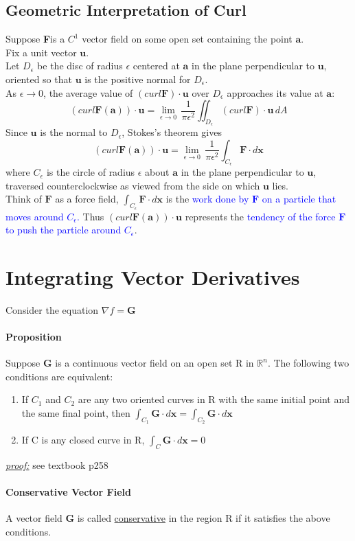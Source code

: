 \documentclass[11pt]{article}
\newcommand{\tb}[1]{\textbf{#1}}
\newcommand{\real}[0]{\mathbb{R}}
\newcommand{\under}[1]{\underline{#1}}
\newcommand{\proof}[0]{\textit{\underline{proof:} }}
\newcommand{\vx}[0]{\tb{x}}
\newcommand{\va}[0]{\tb{a}}
\newcommand{\vf}[0]{\tb{F}}
\newcommand{\vg}[0]{\tb{G}}
\newcommand{\vu}[0]{\tb{u}}
\begin{document}
\subsection{Geometric Interpretation of Curl}
Suppose \vf is a $C^1$ vector field on some open set containing the point $\va$.\\
Fix a unit vector $\vu$. \\
Let $D_\epsilon$ be the disc of radius $\epsilon$ centered at $\va$ in the plane perpendicular to $\vu$, oriented so that $\vu$ is the positive normal for $D_\epsilon$.\\
As $\epsilon \rightarrow 0$, the average value of $(curl \vf) \cdot \vu$ over $D_\epsilon$ approaches its value at $\va$:
$$(curl \vf ( \va ) ) \cdot \vu = \underset{\epsilon \rightarrow 0}{\lim} \,\frac{1}{\pi \epsilon^2} \iint_{D_\epsilon} (curl\vf) \cdot \vu \,dA$$
Since $\vu$ is the normal to $D_\epsilon$, Stokes's theorem gives
$$(curl \vf(\va))\cdot \vu = \underset{\epsilon \rightarrow 0}{\lim} \,\frac{1}{\pi \epsilon^2} \int_{C_\epsilon}\vf\cdot d\vx$$ where $C_\epsilon$ is the circle of radius $\epsilon$ about $\va$ in the plane perpendicular to $\vu$, traversed counterclockwise as viewed from the side on which $\vu$ lies. \\
Think of $\vf$ as a force field, $\int_{C_\epsilon}\vf\cdot d\vx$ is the \textcolor{blue}{work done by $\vf$ on a particle that moves around $C_\epsilon$.} Thus $(curl \vf(\va))\cdot \vu$ represents the \textcolor{blue}{tendency of the force $\vf$ to push the particle around $C_\epsilon$}.
\section{Integrating Vector Derivatives}
Consider the equation $\nabla f = \tb{G}$
\paragraph{Proposition} Suppose \tb{G} is a continuous vector field on an open set R in $\real^n$. The following two conditions are equivalent:
\begin{enumerate}
	\item If $C_1$ and $C_2$ are any two oriented curves in R with the same initial point and the same final point, then $\int_{C_1} \vg \cdot d\vx = \int_{C_2}\vg\cdot d\vx$
	\item If C is any closed curve in R, $\int_C \vg \cdot d\vx = 0$
\end{enumerate}
\proof see textbook p258
\paragraph{Conservative Vector Field} A vector field $\vg$ is called \under{conservative} in the region R if it satisfies the above conditions.
\end{document}
